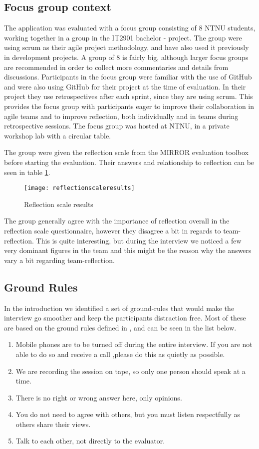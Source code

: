 \subsection{Focus group context}
The application was evaluated with a focus group consisting of 8 NTNU students, working together in a group in the IT2901 bachelor - project. The group were using scrum as their agile project methodology, and have also used it previously in development projects. A group of 8 is fairly big, although larger focus groups are recommended in order to collect more commentaries and details from discussions\citep{morgan1998planning}. Participants in the focus group were familiar with the use of GitHub and were also using GitHub for their project at the time of evaluation. In their project they use retrospectives after each sprint, since they are using scrum. This provides the focus group with participants eager to improve their collaboration in agile teams and to improve reflection, both individually and in teams during retrospective sessions. The focus group was hosted at NTNU, in a private workshop lab with a circular table.  

The group were given the reflection scale from the MIRROR evaluation toolbox before starting the evaluation. Their answers and relationship to reflection can be seen in table \ref{reflectionscaleresults}. 
\begin{figure}[H]
\centering
	\texttt{[image: reflectionscaleresults]}
\caption{Reflection scale results}
\label{reflectionscaleresults}
\end{figure}
The group generally agree with the importance of reflection overall in the reflection scale questionnaire, however they disagree a bit in regards to team-reflection. This is quite interesting, but during the interview we noticed a few very dominant figures in the team and this might be the reason why the answers vary a bit regarding team-reflection.

\subsection{Ground Rules}
In the introduction we identified a set of ground-rules that would make the interview go smoother and keep the participants distraction free. Most of these are based on the ground rules defined in \citet{FocusGrpGuide}, and can be seen in the list below.

\begin{enumerate}
\label{groundrulestest}
\item Mobile phones are to be turned off during the entire interview. If you are not able to do so and receive a call ,please do this as quietly as possible.
\item We are recording the session on tape, so only one person should speak at a time.
\item There is no right or wrong answer here, only opinions.
\item You do not need to agree with others, but you must listen respectfully as others share their views.
\item Talk to each other, not directly to the evaluator.
\end{enumerate}

